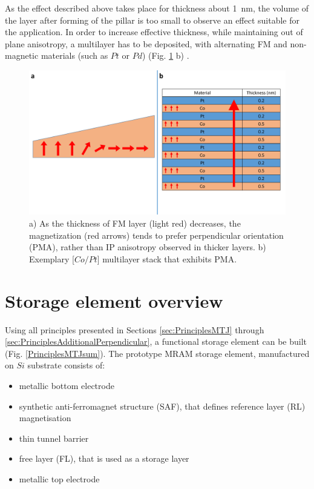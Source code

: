     As the effect described above takes place for thickness about \SI{1}{\nano\meter}, the volume of the layer after forming of the pillar is too small to observe an effect suitable for the application. In order to increase effective thickness, while maintaining out of plane anisotropy, a multilayer has to be deposited, with alternating FM and non-magnetic materials (such as $Pt$ or $Pd$) (Fig. \ref{PrinciplesPerpendicular} b) \cite{kim2017cofesib, park2008co}.
    
    \begin{figure}[H]
        \centering
        \includegraphics[width=0.75\paperwidth, page=1]{img/03/P_anisotropy_all.pdf}
        \caption{a) As the thickness of FM layer (light red) decreases, the magnetization (red arrows) tends to prefer perpendicular orientation (PMA), rather than IP anisotropy observed in thicker layers. b) Exemplary [$Co/Pt$] multilayer stack that exhibits PMA.}
        \label{PrinciplesPerpendicular}
    \end{figure}

\section{Storage element overview} \label{sec:PrinciplesStorageElement}

    Using all principles presented in Sections \ref{sec:PrinciplesMTJ} through \ref{sec:PrinciplesAdditionalPerpendicular}, a functional storage element can be built (Fig. \ref{PrinciplesMTJsum}). The prototype MRAM storage element, manufactured on $Si$ substrate consists of:
    
    \begin{itemize}[label=\textbullet]
    	\item metallic bottom electrode
    	\item synthetic anti-ferromagnet structure (SAF), that defines reference layer (RL) magnetisation
    	\item thin tunnel barrier
    	\item free layer (FL), that is used as a storage layer
    	\item metallic top electrode
    \end{itemize}
    
